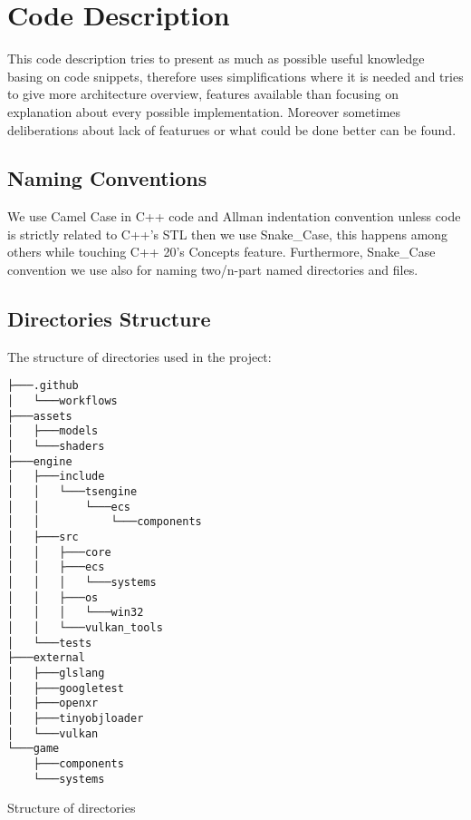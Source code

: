 \newpage
\section{Code Description}
\label{sec:code_descr}
This code description tries to present as much as possible useful knowledge basing on code snippets, therefore uses simplifications where it is needed and tries to give more architecture overview, features available than focusing on explanation about every possible implementation. Moreover sometimes deliberations about lack of featurues or what could be done better can be found.
\subsection{Naming Conventions}
We use Camel Case in C++ code and Allman indentation convention unless code is strictly related to C++'s STL then we use Snake\_Case, this happens among others while touching C++ 20's Concepts feature.
Furthermore, Snake\_Case convention we use also for naming two/n-part named directories and files.

\newpage
\subsection{Directories Structure}
The structure of directories used in the project:
\begin{verbatim}
├───.github
│   └───workflows
├───assets
│   ├───models
│   └───shaders
├───engine
│   ├───include
│   │   └───tsengine
│   │       └───ecs
│   │           └───components
│   ├───src
│   │   ├───core
│   │   ├───ecs
│   │   │   └───systems
│   │   ├───os
│   │   │   └───win32
│   │   └───vulkan_tools
│   └───tests
├───external
│   ├───glslang
│   ├───googletest
│   ├───openxr
│   ├───tinyobjloader
│   └───vulkan
└───game
    ├───components
    └───systems
\end{verbatim}
\begin{table}[h]
\caption{Structure of directories}
\end{table}

\newpage

